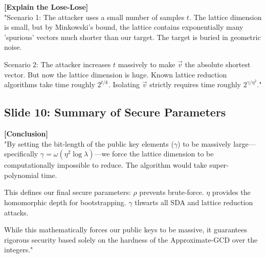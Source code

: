 \documentclass[11pt]{article}
\begin{document}
\textbf{[Explain the Lose-Lose]} \\
"Scenario 1: The attacker uses a small number of samples $t$. The lattice dimension is small, but by Minkowski's bound, the lattice contains exponentially many 'spurious' vectors much shorter than our target. The target is buried in geometric noise.

Scenario 2: The attacker increases $t$ massively to make $\vec{v}$ the absolute shortest vector. But now the lattice dimension is huge. Known lattice reduction algorithms take time roughly $2^{t/k}$. Isolating $\vec{v}$ strictly requires time roughly $2^{\gamma / \eta^2}$."

\subsection*{Slide 10: Summary of Secure Parameters}
\textbf{[Conclusion]} \\
"By setting the bit-length of the public key elements ($\gamma$) to be massively large---specifically $\gamma = \omega(\eta^2 \log \lambda)$---we force the lattice dimension to be computationally impossible to reduce. The algorithm would take super-polynomial time.

This defines our final secure parameters:
$\rho$ prevents brute-force.
$\eta$ provides the homomorphic depth for bootstrapping.
$\gamma$ thwarts all SDA and lattice reduction attacks. 

While this mathematically forces our public keys to be massive, it guarantees rigorous security based solely on the hardness of the Approximate-GCD over the integers."
\end{document}

